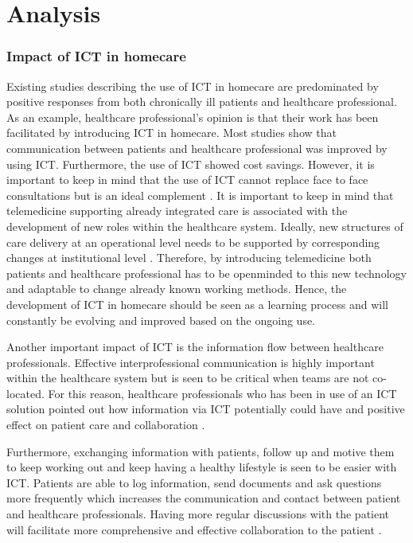 \chapter{Analysis}

\label{analysis}

\subsection{Impact of ICT in homecare}
Existing studies describing the use of ICT in homecare are predominated by positive responses from both chronically ill patients and healthcare professional. As an example, healthcare professional’s opinion is that their work has been facilitated by introducing ICT in homecare. Most studies show that communication between patients and healthcare professional was improved by using ICT. Furthermore, the use of ICT showed cost savings. However, it is important to keep in mind that the use of ICT cannot replace face to face consultations but is an ideal complement \cite{ICT}. It is important to keep in mind that telemedicine supporting already integrated care is associated with the development of new roles within the healthcare system. Ideally, new structures of care delivery at an operational level needs to be supported by corresponding changes at institutional level \cite{countries}. Therefore, by introducing telemedicine both patients and healthcare professional has to be openminded to this new technology and adaptable to change already known working methods. Hence, the development of ICT in homecare should be seen as a learning process and will constantly be evolving and improved based on the ongoing use. 

Another important impact of ICT is the information flow between healthcare professionals. Effective interprofessional communication is highly important within the healthcare system but is seen to be critical when teams are not co-located. For this reason, healthcare professionals who has been in use of an ICT solution pointed out how information via ICT potentially could have and positive effect on patient care and collaboration \cite{barrier}.

Furthermore, exchanging information with patients, follow up and motive them to keep working out and keep having a healthy lifestyle is seen to be easier with ICT. Patients are able to log information, send documents and ask questions more frequently which increases the communication and contact between patient and healthcare professionals. Having more regular discussions with the patient will facilitate more comprehensive and effective collaboration to the patient \cite{barrier}.

